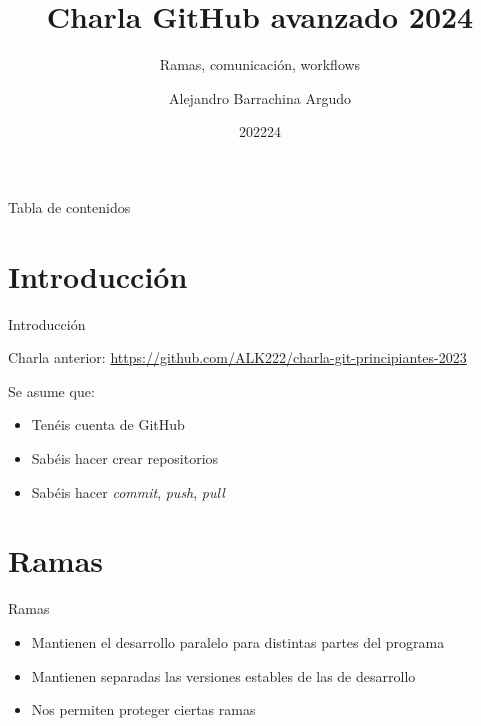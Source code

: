 \documentclass{beamer}
\title{Charla GitHub avanzado 2024}
\subtitle{Ramas, comunicación, workflows}
\date{202224}
\author{Alejandro Barrachina Argudo}
\institute{Universidad Complutense de Madrid}
\begin{document}
\maketitle

\begin{frame}{Tabla de contenidos}
    \tableofcontents
\end{frame}

\section{Introducción}
\begin{frame}{Introducción}

    Charla anterior: \url{https://github.com/ALK222/charla-git-principiantes-2023}
    
    Se asume que:
    \begin{itemize}
        \item Tenéis cuenta de GitHub
        \item Sabéis hacer crear repositorios
        \item Sabéis hacer \textit{commit}, \textit{push}, \textit{pull}
    \end{itemize}
\end{frame}

\section{Ramas}
\begin{frame}{Ramas}
    \begin{itemize}
    \item Mantienen el desarrollo paralelo para distintas partes del programa

    \item Mantienen separadas las versiones estables de las de desarrollo
     
    \item Nos permiten proteger ciertas ramas
\end{itemize}

\end{frame}
\end{document}
